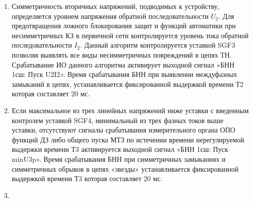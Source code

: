 \begin{enumerate}
\begin{equation*}
    dU_0=\lvert 3U_{0\textsl{вычисл.}} - \frac{3U_{0\textsl{вычисл.ном.}}}{3U_{0\textsl{изм.ном.}}}3U_{0\textsl{изм.}}  \rvert,
\end{equation*}
\item
Симметричность вторичных напряжений, подводимых к устройству, определяется уровнем напряжения обратной последовательности $U_2$. Для предотвращения ложного блокирования защит и
функций автоматики при несимметричных КЗ в первичной сети контролируется уровень тока обратной последовательности $I_2$. Данный алгоритм контролируется уставкой SGF3 позволяя выявлять все виды несимметричных повреждений в цепях ТН. Срабатывание ИО данного алгоритма активирует выходной сигнал «БНН 1сш: Пуск U2I2». Время срабатывания БНН при выявлении междуфазных замыканий в цепях, устанавливается фиксированной выдержкой времени Т2 которая составляет 20 мс.
\item
Если максимальное из трех линейных напряжений ниже уставки с введенным контролем уставкой SGF4, минимальный из трех фазных токов выше уставки, отсутствуют сигналы срабатывания измерительного органа ОПО функций ДЗ либо общего пуска МТЗ по истечении времени нерегулируемой выдержки времени Т3 активируется выходной сигнал «БНН 1сш: Пуск minU3p». Время срабатывания БНН
при симметричных замыканиях и симметричных обрывов в цепях «звезды» устанавливается фиксированной выдержкой времени Т3 которая составляет 20 мс.
\item

\end{enumerate}
